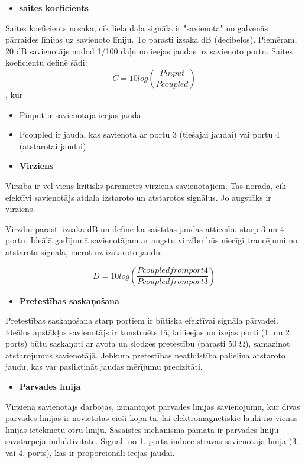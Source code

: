 \begin{itemize}
    \item \textbf{saites koeficients}
\end{itemize}
Saites koeficients nosaka, cik liela daļa signāla ir "savienota" no galvenās pārraides līnijas uz savienoto līniju. To parasti izsaka dB (decibelos). Piemēram, 20 dB savienotājs nodod 1/100 daļu no ieejas jaudas uz savienoto portu.
Saites koeficientu definē šādi:
\[
C = 10log(\frac{Pinput}{Pcoupled})
\]
, kur
\begin{itemize}
    \item Pinput ir savienotāja ieejas jauda.
    \item Pcoupled ir jauda, kas savienota ar portu 3 (tiešajai jaudai) vai portu 4 (atstarotai jaudai)
\end{itemize}

\begin{itemize}
    \item \textbf{Virziens}
\end{itemize}
Virzība ir vēl viens kritisks parametrs virziena savienotājiem. Tas norāda, cik efektīvi savienotājs atdala izstaroto un atstarotos signālus. Jo augstāks ir virziens.

Virzību parasti izsaka dB un definē kā saistītās jaudas attiecību starp 3 un 4 portu. Ideālā gadījumā savienotājam ar augstu virzību būs niecīgi traucējumi no atstarotā signāla, mērot uz izstaroto jaudu.

\[
D = 10log(\frac{Pcoupledfromport4}{Pcoupledfromport3})
\]

\begin{itemize}
    \item \textbf{Pretestības saskaņošana}
\end{itemize}
Pretestības saskaņošana starp portiem ir būtiska efektīvai signāla pārvadei. Ideālos apstākļos savienotājs ir konstruēts tā, lai ieejas un izejas porti (1. un 2. ports) būtu saskaņoti ar avota un slodzes pretestību (parasti 50 Ω), samazinot atstarojumus savienotājā. Jebkura pretestības neatbilstība palielina atstaroto jaudu, kas var pasliktināt jaudas mērījumu precizitāti.
\begin{itemize}
    \item \textbf{Pārvades līnija}
\end{itemize}
Virziena savienotājs darbojas, izmantojot pārvades līnijas savienojumu, kur divas pārvades līnijas ir novietotas cieši kopā tā, lai elektromagnētiskie lauki no vienas līnijas ietekmētu otru līniju. Sasaistes mehānisma pamatā ir pārvades līniju savstarpējā induktivitāte. Signāli no 1. porta inducē strāvas savienotajā līnijā (3. vai 4. ports), kas ir proporcionāli ieejas jaudai.

